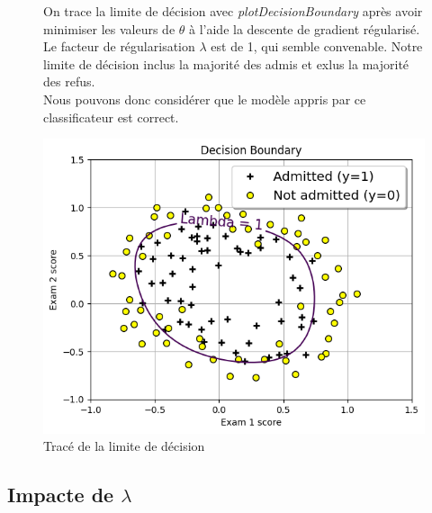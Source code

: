 \begin{figure}[!h]
    \begin{minipage}{.48\linewidth}
       On trace la limite de décision avec \textit{plotDecisionBoundary} après avoir minimiser les valeurs de $\theta$ à l'aide la descente de gradient régularisé. \\
       Le facteur de régularisation $\lambda$ est de 1, qui semble convenable. Notre limite de décision inclus la majorité des admis et exlus la majorité des refus. \\

       Nous pouvons donc considérer que le modèle appris par ce classificateur est correct.

    \end{minipage}\hfill
    \begin{minipage}{.48\linewidth}
        \begin{center}
            \includegraphics[width=1\textwidth]{./img/4.4.png}
            \caption{\label{fig:4.4}Tracé de la limite de décision}  
        \end{center}
    \end{minipage}
\end{figure}


\subsection{Impacte de $\lambda$}

